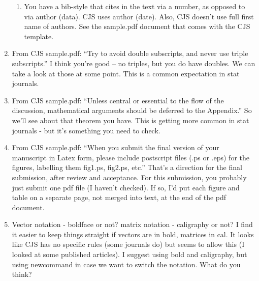 \begin{enumerate}
\begin{enumerate}
    \item You have a bib-style that cites in the text via a number, as opposed to via author (data).   CJS uses author (date).  Also,  CJS doesn't use full first name of authors.  See the sample.pdf document that comes with the CJS template.
    \end{enumerate}
    \item From CJS sample.pdf: ``Try to avoid double subscripts, and never use triple subscripts.''  I think you're good -- no triples, but you do have doubles.  We can take a look at those at some point.   This is a common expectation in stat journals.
    \item From CJS sample.pdf: ``Unless central or essential to the ﬂow of the discussion, mathematical arguments should be deferred to the Appendix.''  So we'll see about that theorem you have.  This is getting more common in stat journals - but it's something you need to check.
    \item From CJS sample.pdf: ``When you submit the ﬁnal version of your manuscript in Latex form, please include postscript ﬁles (.ps or .eps) for the ﬁgures, labelling them ﬁg1.ps, ﬁg2.ps, etc.''  That's a direction for the final submission, after review and acceptance. For this submission, you probably just submit one pdf file (I haven't checked).  If so, I'd put each figure and table on a separate page, not merged into text, at the end of the pdf document.
    \item Vector notation - boldface or not?  matrix notation - caligraphy or not?   I find it easier to keep things straight if vectors are in bold, matrices in cal.   It looks like CJS has no specific rules (some journals do) but seems to allow this (I looked at some published articles). I suggest using bold and caligraphy, but using newcommand in case we want to switch the notation.    What do you think?
\end{enumerate}

